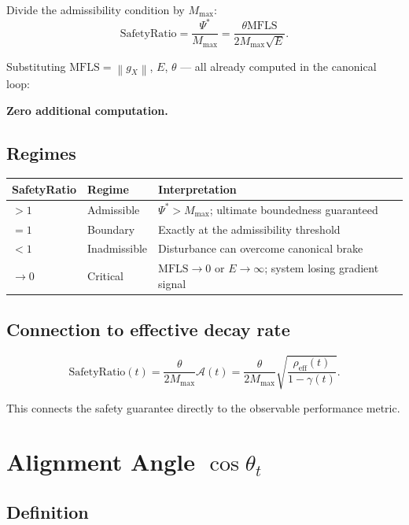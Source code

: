\documentclass[11pt,a4paper]{article}
\theoremstyle{definition}
\newcommand{\norm}[1]{\left\|#1\right\|}
\newcommand{\gX}{g_X}
\newcommand{\mfls}{\mathrm{MFLS}}
\begin{document}
Divide the admissibility condition by $M_\mathrm{max}$:
\[
\mathrm{SafetyRatio} = \frac{\Psi^*}{M_\mathrm{max}} = \frac{\theta\mfls}{2M_\mathrm{max}\sqrt{E}}.
\]

Substituting $\mfls = \norm{\gX}$, $E$, $\theta$ — all already computed in the canonical loop:

\textbf{Zero additional computation.}

\subsection{Regimes}

\begin{center}
\begin{tabular}{lll}
\toprule
SafetyRatio & Regime & Interpretation \\
\midrule
$> 1$ & Admissible & $\Psi^* > M_\mathrm{max}$; ultimate boundedness guaranteed \\
$= 1$ & Boundary & Exactly at the admissibility threshold \\
$< 1$ & Inadmissible & Disturbance can overcome canonical brake \\
$\to 0$ & Critical & $\mfls \to 0$ or $E \to \infty$; system losing gradient signal \\
\bottomrule
\end{tabular}
\end{center}

\subsection{Connection to effective decay rate}

\[
\mathrm{SafetyRatio}(t) = \frac{\theta}{2M_\mathrm{max}}\mathcal{A}(t) = \frac{\theta}{2M_\mathrm{max}}\sqrt{\frac{\rho_\mathrm{eff}(t)}{1-\gamma(t)}}.
\]

This connects the safety guarantee directly to the observable performance metric.

\section{Alignment Angle $\cos\theta_t$}

\subsection{Definition}
\end{document}
